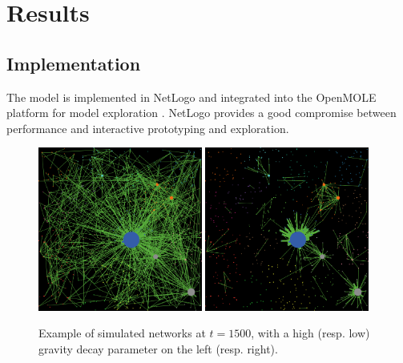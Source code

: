 \documentclass{article}
\begin{document}
\section{Results}

\subsection{Implementation}



The model is implemented in NetLogo and integrated into the OpenMOLE platform for model exploration \cite{reuillon2013openmole}. NetLogo provides a good compromise between performance and interactive prototyping and exploration.



\begin{figure}
    \includegraphics[width=0.48\textwidth]{figures/ex_alleq-highgravity_seed-12102_t1500.png}
    \includegraphics[width=0.48\textwidth]{figures/ex_alleq-lowgravity_seed-12102_t1500.png}	
    \caption{Example of simulated networks at $t=1500$, with a high (resp. low) gravity decay parameter on the left (resp. right).\label{fig:example}}
\end{figure}
\end{document}
